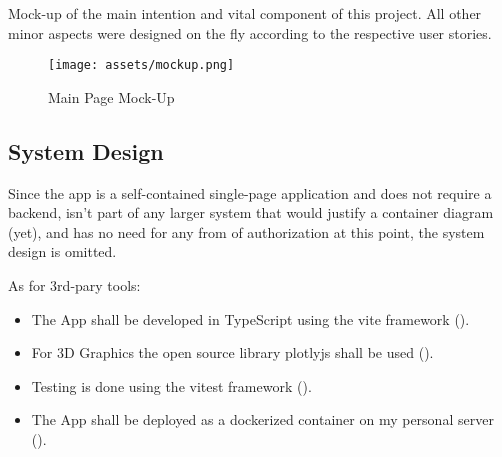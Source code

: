 Mock-up of the main intention and vital component of this project. All other minor aspects were designed on the fly according to the respective user stories.
\begin{figure}[!h]
    \centering
    \caption{Main Page Mock-Up}
    \texttt{[image: assets/mockup.png]}
    \label{fig:mockup}
\end{figure}

\subsection{System Design}

Since the app is a self-contained single-page application and does not require a backend, isn’t part of any larger system that would justify a container diagram (yet), and has no need for any from of authorization at this point, the system design is omitted.

As for 3rd-pary tools:
\begin{itemize}
    \item The App shall be developed in TypeScript using the vite framework (\cite{Vite}).

    \item For 3D Graphics the open source library plotlyjs shall be used (\cite{PlotlyJS}).

    \item Testing is done using the vitest framework (\cite{Vitest}).

    \item The App shall be deployed as a dockerized container on my personal server (\cite{Docker}).
\end{itemize}